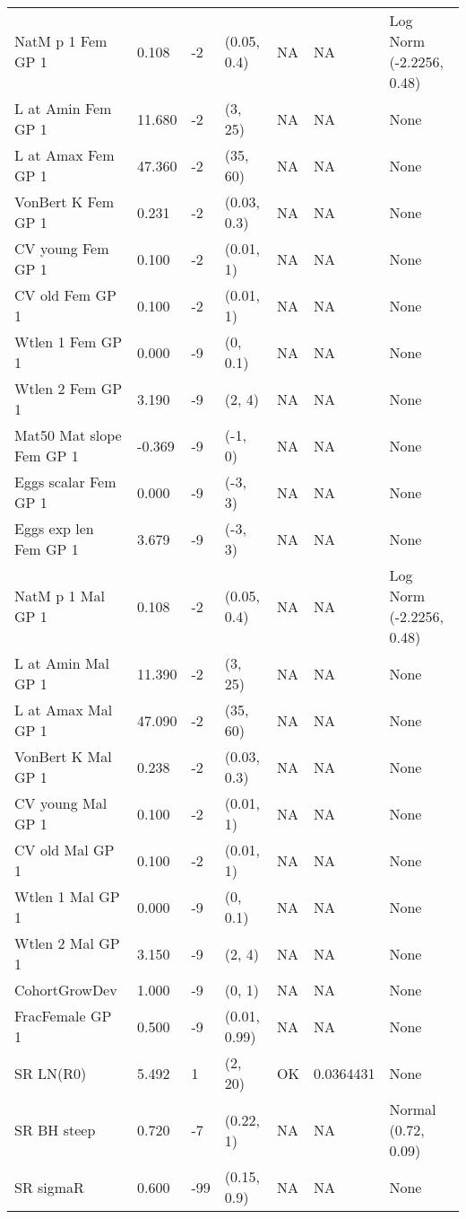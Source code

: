 \documentclass[11pt,
  english,
  a4paper,
]{article}
\begin{document}
\begin{landscape}
\begin{longtable}[t]{>{\raggedright\arraybackslash}p{6cm}lllll>{\raggedright\arraybackslash}p{4cm}}
\endfoot
\bottomrule
\endlastfoot
NatM p 1 Fem GP 1 & 0.108 & -2 & (0.05, 0.4) & NA & NA & Log Norm (-2.2256, 0.48)\\
L at Amin Fem GP 1 & 11.680 & -2 & (3, 25) & NA & NA & None\\
L at Amax Fem GP 1 & 47.360 & -2 & (35, 60) & NA & NA & None\\
VonBert K Fem GP 1 & 0.231 & -2 & (0.03, 0.3) & NA & NA & None\\
CV young Fem GP 1 & 0.100 & -2 & (0.01, 1) & NA & NA & None\\
CV old Fem GP 1 & 0.100 & -2 & (0.01, 1) & NA & NA & None\\
Wtlen 1 Fem GP 1 & 0.000 & -9 & (0, 0.1) & NA & NA & None\\
Wtlen 2 Fem GP 1 & 3.190 & -9 & (2, 4) & NA & NA & None\\
Mat50%
Mat slope Fem GP 1 & -0.369 & -9 & (-1, 0) & NA & NA & None\\
Eggs scalar Fem GP 1 & 0.000 & -9 & (-3, 3) & NA & NA & None\\
Eggs exp len Fem GP 1 & 3.679 & -9 & (-3, 3) & NA & NA & None\\
NatM p 1 Mal GP 1 & 0.108 & -2 & (0.05, 0.4) & NA & NA & Log Norm (-2.2256, 0.48)\\
L at Amin Mal GP 1 & 11.390 & -2 & (3, 25) & NA & NA & None\\
L at Amax Mal GP 1 & 47.090 & -2 & (35, 60) & NA & NA & None\\
VonBert K Mal GP 1 & 0.238 & -2 & (0.03, 0.3) & NA & NA & None\\
CV young Mal GP 1 & 0.100 & -2 & (0.01, 1) & NA & NA & None\\
CV old Mal GP 1 & 0.100 & -2 & (0.01, 1) & NA & NA & None\\
Wtlen 1 Mal GP 1 & 0.000 & -9 & (0, 0.1) & NA & NA & None\\
Wtlen 2 Mal GP 1 & 3.150 & -9 & (2, 4) & NA & NA & None\\
CohortGrowDev & 1.000 & -9 & (0, 1) & NA & NA & None\\
FracFemale GP 1 & 0.500 & -9 & (0.01, 0.99) & NA & NA & None\\
SR LN(R0) & 5.492 & 1 & (2, 20) & OK & 0.0364431 & None\\
SR BH steep & 0.720 & -7 & (0.22, 1) & NA & NA & Normal (0.72, 0.09)\\
SR sigmaR & 0.600 & -99 & (0.15, 0.9) & NA & NA & None\\

\end{longtable}
\end{landscape}
\end{document}
